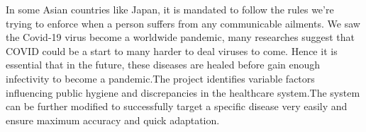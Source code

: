 \documentclass[12pt]{article}
\begin{document}
\vspace{\baselineskip}
\setlength{\parskip}{9.96pt}
\setlength{\parskip}{0.0pt}
\begin{justify}
 In some Asian countries like Japan, it is mandated to follow the rules we’re trying to enforce when a person suffers from any communicable ailments. We saw the Covid-19 virus become a worldwide pandemic, many researches suggest that COVID could be a start to many harder to deal viruses to come. Hence it is essential that in the future, these diseases are healed before gain enough infectivity to become a pandemic.The project identifies variable factors influencing public hygiene and discrepancies in the healthcare system.The system can be further modified to successfully target a specific disease very easily and ensure maximum accuracy and quick adaptation.
\end{justify}

\vspace{\baselineskip}
\setlength{\parskip}{9.96pt}

\vspace{\baselineskip}
\setlength{\parskip}{0.0pt}
\setlength{\parskip}{9.96pt}

\vspace{\baselineskip}
\setlength{\parskip}{0.0pt}
\setlength{\parskip}{9.96pt}

\vspace{\baselineskip}
\setlength{\parskip}{0.0pt}
\setlength{\parskip}{9.96pt}

\vspace{\baselineskip}
\setlength{\parskip}{0.0pt}
\setlength{\parskip}{9.96pt}

\vspace{\baselineskip}
\setlength{\parskip}{0.0pt}
\setlength{\parskip}{9.96pt}

\vspace{\baselineskip}
\setlength{\parskip}{0.0pt}
\setlength{\parskip}{9.96pt}

\vspace{\baselineskip}
\setlength{\parskip}{0.0pt}
\setlength{\parskip}{9.96pt}

\vspace{\baselineskip}
\setlength{\parskip}{0.0pt}
\setlength{\parskip}{9.96pt}

\vspace{\baselineskip}
\setlength{\parskip}{0.0pt}
\setlength{\parskip}{9.96pt}

\vspace{\baselineskip}
\setlength{\parskip}{0.0pt}
\setlength{\parskip}{9.96pt}
\end{document}
